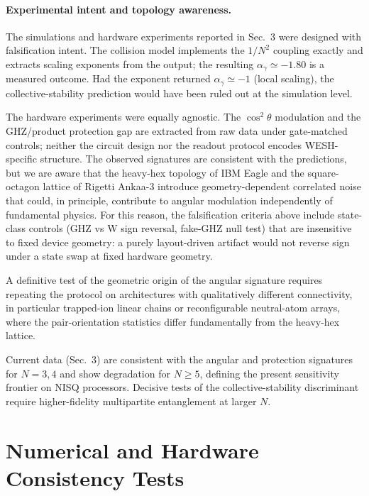\documentclass[12pt,a4paper]{article}
\numberwithin{equation}{section}
\begin{document}
\paragraph{Experimental intent and topology awareness.}
The simulations and hardware experiments reported in Sec.~3 were designed with falsification intent. The collision model implements the $1/N^2$ coupling exactly and extracts scaling exponents from the output; the resulting $\alpha_\gamma \simeq -1.80$ is a measured outcome. Had the exponent returned $\alpha_\gamma \simeq -1$ (local scaling), the collective-stability prediction would have been ruled out at the simulation level.

The hardware experiments were equally agnostic. The $\cos^2\theta$ modulation and the GHZ/product protection gap are extracted from raw data under gate-matched controls; neither the circuit design nor the readout protocol encodes WESH-specific structure. The observed signatures are consistent with the predictions, but we are aware that the heavy-hex topology of IBM Eagle and the square-octagon lattice of Rigetti Ankaa-3 introduce geometry-dependent correlated noise that could, in principle, contribute to angular modulation independently of fundamental physics. For this reason, the falsification criteria above include state-class controls (GHZ vs W sign reversal, fake-GHZ null test) that are insensitive to fixed device geometry: a purely layout-driven artifact would not reverse sign under a state swap at fixed hardware geometry.

A definitive test of the geometric origin of the angular signature requires repeating the protocol on architectures with qualitatively different connectivity, in particular trapped-ion linear chains or reconfigurable neutral-atom arrays, where the pair-orientation statistics differ fundamentally from the heavy-hex lattice.

\noindent Current data (Sec.~3) are consistent with the angular and protection signatures for $N=3,4$ and show
degradation for $N\ge 5$, defining the present sensitivity frontier on NISQ processors. Decisive tests of the
collective-stability discriminant require higher-fidelity multipartite entanglement at larger $N$.
\vspace{0.8cm}

\section{Numerical and Hardware Consistency Tests}  
\label{sec:experimental}
\setcounter{figure}{0}
\renewcommand{\thefigure}{3.\arabic{figure}}
\end{document}
